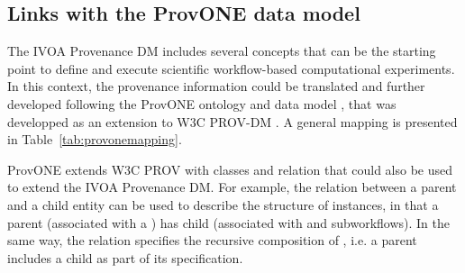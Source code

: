 





\subsection{Links with the ProvONE data model}

The IVOA Provenance DM includes several concepts that can be the starting point to define and execute scientific workflow-based computational experiments. In this context, the provenance information could be translated and further developed following the ProvONE ontology and data model \citep{ProvONE}, that was developped as an extension to W3C PROV-DM \citep{std:W3CProvDM}. A general mapping is presented in Table~\ref{tab:provonemapping}.

ProvONE extends W3C PROV with classes and relation that could also be used to extend the IVOA Provenance DM. For example, the relation  between a parent and a child entity can be used to describe the structure of  instances, in that a parent  (associated with a ) has child  (associated with  and subworkflows). In the same way, the  relation specifies the recursive composition of , i.e. a parent  includes a child  as part of its specification.

